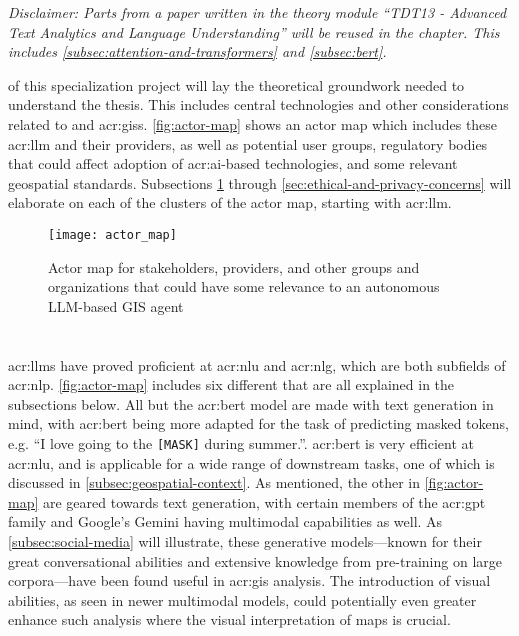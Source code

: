 \textit{Disclaimer: Parts from a paper written in the theory module \enquote{TDT13 - Advanced Text Analytics and Language Understanding} will be reused in the  chapter. This includes \autoref{subsec:attention-and-transformers} and \autoref{subsec:bert}.}

\vspace{12pt}

 of this specialization project will lay the theoretical groundwork needed to understand the thesis. This includes central technologies and other considerations related to  and \glspl{acr:gis}. \autoref{fig:actor-map} shows an actor map which includes these \acrshort{acr:llm} and their providers, as well as potential user groups, regulatory bodies that could affect adoption of \acrshort{acr:ai}-based technologies, and some relevant geospatial standards. Subsections \ref{sec:llms} through \ref{sec:ethical-and-privacy-concerns} will elaborate on each of the clusters of the actor map, starting with \acrshort{acr:llm}.

\begin{figure}
    \texttt{[image: actor\_map]}
    \caption{Actor map for stakeholders, providers, and other groups and organizations that could have some relevance to an autonomous LLM-based GIS agent}
    \label{fig:actor-map}
\end{figure}

\section[Large Language Models]{}\label{sec:llms}

\glspl{acr:llm} have proved proficient at \gls{acr:nlu} and \gls{acr:nlg}, which are both subfields of \gls{acr:nlp}. \autoref{fig:actor-map} includes six different  that are all explained in the subsections below. All but the \acrshort{acr:bert} model are made with text generation in mind, with \acrshort{acr:bert} being more adapted for the task of predicting masked tokens, e.g. \enquote{I love going to the \texttt{[MASK]} during summer.}. \acrshort{acr:bert} is very efficient at \gls{acr:nlu}, and is applicable for a wide range of downstream tasks, one of which is discussed in \autoref{subsec:geospatial-context}. As mentioned, the other  in \autoref{fig:actor-map} are geared towards text generation, with certain members of the \acrshort{acr:gpt} family and Google's Gemini having multimodal capabilities as well. As \autoref{subsec:social-media} will illustrate, these generative models---known for their great conversational abilities and extensive knowledge from pre-training on large corpora---have been found useful in \gls{acr:gis} analysis. The introduction of visual abilities, as seen in newer multimodal models, could potentially even greater enhance such analysis where the visual interpretation of maps is crucial.

